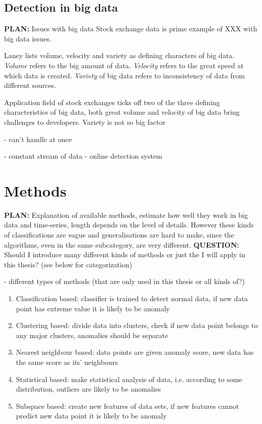 \documentclass{tut-thesis}
\begin{document}
\subsection{Detection in big data}
\textbf{PLAN:} Issues with big data
Stock exchange data is prime example of XXX with big data issues.

Laney \autocite*{Laney2001} lists volume, velocity and variety as defining characters of big data. 
\textit{Volume} refers to the big amount of data.
\textit{Velocity} refers to the great speed at which data is created.
\textit{Variety} of big data refers to inconsistency of data from different sources. 

Application field of stock exchanges ticks off two of the three defining characteristics of big data, both great volume and velocity of big data bring challenges to developers. Variety is not so big factor

- can't handle at once

- constant stream of data
- online detection system


\section{Methods}
\textbf{PLAN:} Explanation of available methods, estimate how well they work in big data and time-series, length depends on the level of details. However these kinds of classifications are vague and generalisations are hard to make, since the algorithms, even in the same subcategory, are very different. 
\textbf{QUESTION:} Should I introduce many different kinds of methods or just the I will apply in this thesis? (see below for categorization)

- different types of methods (that are only used in this thesis or all kinds of?)
\begin{enumerate}
	\item Classification based: classifier is trained to detect normal data, if new data point has extreme value it is likely to be anomaly
	\item Clustering based: divide data into clusters, check if new data point belongs to any major clusters, anomalies should be separate 
	\item Nearest neighbour based: data points are given anomaly score, new data has the same score as its' neighbours
	\item Statistical based: make statistical analysis of data, i.e. according to some distribution, outliers are likely to be anomalies
	\item Subspace based: create new features of data sets, if new features cannot predict new data point it is likely to be anomaly
\end{enumerate}
\end{document}
